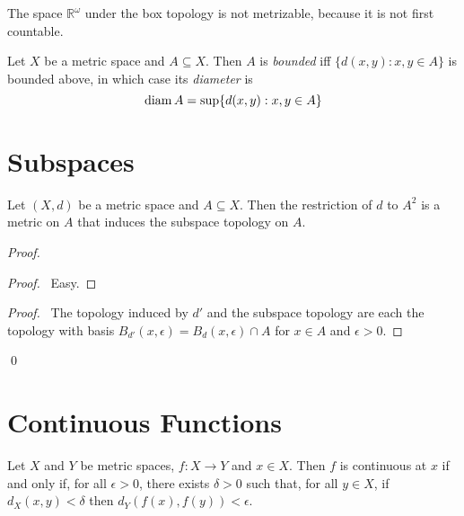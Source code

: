\begin{ex}
  The space $\mathbb{R}^\omega$ under the box topology is not metrizable, because it is not first countable.
\end{ex}

\begin{df}[Bounded]
  Let $X$ be a metric space and $A \subseteq X$. Then $A$ is \emph{bounded} iff $\{ d(x,y) : x,y \in A \}$ is bounded above, in which case its \emph{diameter} is
  \[ \operatorname{diam} A = \sup \{ d(x,y) : x, y \in A \} \]
\end{df}

\section{Subspaces}

\begin{prop}
  Let $(X, d)$ be a metric space and $A \subseteq X$. Then the restriction of $d$ to $A^2$ is a metric on $A$ that induces the subspace topology on $A$.
\end{prop}

\begin{proof}
  \pf
  \begin{proof}
    \pf\ Easy.
  \end{proof}
  \begin{proof}
    \pf\ The topology induced by $d'$ and the subspace topology are each the topology with basis $B_{d'}(x, \epsilon) = B_d(x, \epsilon) \cap A$ for $x \in A$ and $\epsilon > 0$.
  \end{proof}
  \qed
\end{proof}

\section{Continuous Functions}

\begin{prop}
  Let $X$ and $Y$ be metric spaces, $f : X \rightarrow Y$ and $x \in X$. Then $f$ is continuous at $x$ if and only if, for all $\epsilon > 0$, there exists $\delta > 0$ such that, for all $y \in X$, if $d_X(x,y) < \delta$ then $d_Y(f(x),f(y)) < \epsilon$.
\end{prop}

